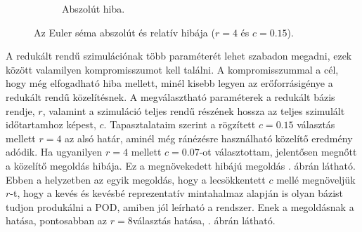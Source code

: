 \begin{figure}[h]
\begin{subfigure}{0.48\textwidth}
                \caption{Abszolút hiba.}
            \end{subfigure}
            \caption{Az Euler séma abszolút és relatív hibája ($r=4$ és $c=0.15$).}
            \label{fig:hiba}
        \end{figure}
        A redukált rendű szimulációnak több paraméterét lehet szabadon megadni, ezek között valamilyen kompromisszumot kell találni. A kompromisszummal a cél, hogy még elfogadható hiba mellett, minél kisebb legyen az erőforrásigénye a redukált rendű közelítésnek. A megválasztható paraméterek a redukált bázis rendje, $r$, valamint a szimuláció teljes rendű részének hossza az teljes szimulált időtartamhoz képest, $c$. Tapasztalataim szerint a rögzített $c=0.15$ választás mellett $r=4$ az alsó határ, aminél még ránézésre használható közelítő eredmény adódik. Ha ugyanilyen $r=4$ mellett $c=0.07$-ot választottam, jelentősen megnőtt a közelítő megoldás hibája. Ez a megnövekedett hibájú megoldás . ábrán látható. Ebben a helyzetben az egyik megoldás, hogy a lecsökkentett $c$ mellé megnöveljük $r$-t, hogy a kevés és kevésbé reprezentatív mintahalmaz alapján is olyan bázist tudjon produkálni a POD, amiben jól leírható a rendszer. Enek a megoldásnak a hatása, pontosabban az $r=8$választás hatása, . ábrán látható.
